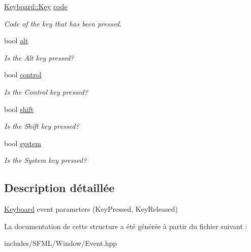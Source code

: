 \begin{DoxyCompactItemize}
\item 
\mbox{\label{structsf_1_1Event_1_1KeyEvent_a2879fdab8a68cb1c6ecc45730a2d0e61}} 
\hyperlink{classsf_1_1Keyboard_acb4cacd7cc5802dec45724cf3314a142}{Keyboard\+::\+Key} \hyperlink{structsf_1_1Event_1_1KeyEvent_a2879fdab8a68cb1c6ecc45730a2d0e61}{code}
\begin{DoxyCompactList}\small\item\em Code of the key that has been pressed. \end{DoxyCompactList}\item 
\mbox{\label{structsf_1_1Event_1_1KeyEvent_a915a483317de67d995188a855701fbd7}} 
bool \hyperlink{structsf_1_1Event_1_1KeyEvent_a915a483317de67d995188a855701fbd7}{alt}
\begin{DoxyCompactList}\small\item\em Is the Alt key pressed? \end{DoxyCompactList}\item 
\mbox{\label{structsf_1_1Event_1_1KeyEvent_a9255861c2f88501d80ad6b44a310b62f}} 
bool \hyperlink{structsf_1_1Event_1_1KeyEvent_a9255861c2f88501d80ad6b44a310b62f}{control}
\begin{DoxyCompactList}\small\item\em Is the Control key pressed? \end{DoxyCompactList}\item 
\mbox{\label{structsf_1_1Event_1_1KeyEvent_a776af1a3ca79abeeec18ebf1c0065aa9}} 
bool \hyperlink{structsf_1_1Event_1_1KeyEvent_a776af1a3ca79abeeec18ebf1c0065aa9}{shift}
\begin{DoxyCompactList}\small\item\em Is the Shift key pressed? \end{DoxyCompactList}\item 
\mbox{\label{structsf_1_1Event_1_1KeyEvent_ac0557f7edc2a608ec65175fdd843afc5}} 
bool \hyperlink{structsf_1_1Event_1_1KeyEvent_ac0557f7edc2a608ec65175fdd843afc5}{system}
\begin{DoxyCompactList}\small\item\em Is the System key pressed? \end{DoxyCompactList}\end{DoxyCompactItemize}


\subsection{Description détaillée}
\hyperlink{classsf_1_1Keyboard}{Keyboard} event parameters (Key\+Pressed, Key\+Released) 

La documentation de cette structure a été générée à partir du fichier suivant \+:\begin{DoxyCompactItemize}
\item 
includes/\+S\+F\+M\+L/\+Window/Event.\+hpp\end{DoxyCompactItemize}
